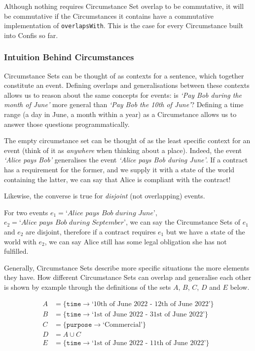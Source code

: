 Although nothing requires Circumstance Set overlap to be commutative, it will be commutative if the Circumstances it contains have a commutative implementation of \texttt{overlapsWith}.
This is the case for every Circumstance built into Confis so far.

\subsubsection{Intuition Behind Circumstances}\label{subsubsec:circumstances-intuition}

Circumstance Sets can be thought of as contexts for a sentence, which together constitute an event.
Defining overlaps and generalisations between these contexts allows us to reason about the same concepts for events: is \emph{`Pay Bob during the month of June'} more general than \emph{`Pay Bob the 10th of June'}? Defining a time range (a day in June, a month within a year) as a Circumstance allows us to answer those questions programmatically.

The empty circumstance set can be thought of as the least specific context for an event (think of it as \emph{anywhere} when thinking about a place).
Indeed, the event \emph{`Alice pays Bob'} generalises the event \emph{`Alice pays Bob during June'}.
If a contract has a requirement for the former, and we supply it with a state of the world containing the latter, we can say that Alice is compliant with the contract!

Likewise, the converse is true for \emph{disjoint} (not overlapping) events.

For two events $e_1 = \textit{`Alice pays Bob during June'}$,  $e_2 = \textit{`Alice pays Bob during September'}$, we can say the Circumstance Sets of $e_1$ and $e_2$ are disjoint, therefore if a contract requires $e_1$ but we have a state of the world with $e_2$, we can say Alice still has some legal obligation she has not fulfilled.

Generally, Circumstance Sets describe more specific situations the more elements they have.
How different Circumstance Sets can overlap and generalise each other is shown by example through the definitions of the sets $A$, $B$, $C$, $D$ and $E$ below.

\begin{align}
    A &= \{ \texttt{time} \to \text{`10th of June 2022 - 12th of June 2022'} \}\\
    B &= \{ \texttt{time} \to \text{`1st of June 2022 - 31st of June 2022'} \}\\
    C &= \{ \texttt{purpose} \to \text{`Commercial'} \}\\
    D &= A \cup C\\
    E &= \{ \texttt{time} \to \text{`1st of June 2022 - 11th of June 2022'} \}
\end{align}


